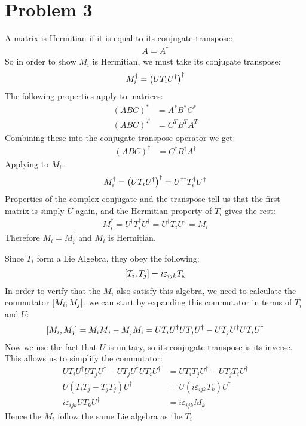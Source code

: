 \documentclass[12pt]{article}
\begin{document}
\section*{Problem 3}
A matrix is Hermitian if it is equal to its conjugate transpose:
\begin{align*}
  A=A^\dag
\end{align*}
So in order to show $M_i$ is Hermitian, we must take its conjugate transpose:
\begin{align*}
  M_i^\dag=\qty(UT_iU^\dag)^\dag
\end{align*}
The following properties apply to matrices:
\begin{align*}
  (ABC)^*&=A^*B^*C^*\\
  (ABC)^T&=C^TB^TA^T
\end{align*}
Combining these into the conjugate transpose operator we get:
\begin{align*}
  (ABC)^\dag&=C^\dag B^\dag A^\dag 
\end{align*}
Applying to $M_i$:
\begin{align*}
  M_i^\dag=\qty(UT_iU^\dag)^\dag=U^{\dag\dag}T_i^\dag U^\dag
\end{align*}
Properties of the complex conjugate and the transpose tell us that the first matrix is simply $U$ again, and the Hermitian property of $T_i$ gives the rest:
\begin{align*}
  M_i^\dag=U^{\dag}T_i^\dag U^\dag=U^{\dag}T_iU^\dag=M_i
\end{align*}
Therefore $M_i=M_i^\dag$ and $M_i$ is Hermitian.

Since $T_i$ form a Lie Algebra, they obey the following:
\begin{align*}
  \comm{T_i}{T_j}=i\varepsilon_{ijk}T_k
\end{align*}
In order to verify that the $M_i$ also satisfy this algebra, we need to calculate the commutator $\comm{M_i}{M_j}$, we can start by expanding this commutator in terms of $T_i$ and $U$:
\begin{align*}
  \comm{M_i}{M_j}=M_iM_j-M_jM_i=UT_iU^{\dag}UT_jU^\dag-UT_jU^{\dag}UT_iU^\dag
\end{align*}
Now we use the fact that $U$ is unitary, so its conjugate transpose is its inverse. This allows us to simplify the commutator:
\begin{align*}
  UT_iU^{\dag}UT_jU^\dag-UT_jU^{\dag}UT_iU^\dag&=UT_iT_jU^\dag-UT_jT_iU^\dag\\
  U(T_iT_j-T_jT_j)U^\dag&=U(i\varepsilon_{ijk}T_k)U^\dag\\
  i\varepsilon_{ijk}UT_kU^\dag&=\boxed{i\varepsilon_{ijk}M_k}
\end{align*}
Hence the $M_i$ follow the same Lie algebra as the $T_i$
\end{document}
